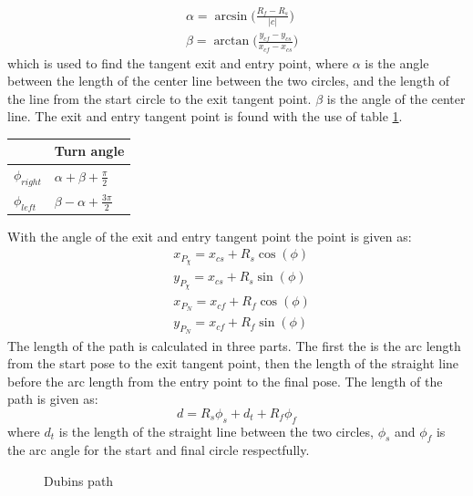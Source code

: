 \begin{subequations}
\begin{align}
& \alpha = \arcsin\big(\frac{R_f-R_s}{|c|}\big) \\
& \beta = \arctan\big(\frac{y_{cf}-y_{cs}}{x_{cf}-x_{cs}}\big)
\end{align}
\end{subequations}
which is used to find the tangent exit and entry point, where $\alpha$ is the angle between the length of the center line between the two circles, and the length of the line from the start circle to the exit tangent point. $\beta$ is the angle of the center line. The exit and entry tangent point is found with the use of table \ref{Tb:ExitEntyrTangent}.
\begin{table}[H]
\begin{center}
\begin{tabular}{ | l | | l |}
\hline
& \textbf{Turn angle} \\ \hline
$\phi_{right}$ & $\alpha + \beta + \frac{\pi}{2}$ \\
$\phi_{left}$ & $\beta - \alpha + \frac{3\pi}{2}$ \\ \hline
\end{tabular}
\end{center}
\label{Tb:ExitEntyrTangent}
\end{table}
With the angle of the exit and entry tangent point the point is given as:
\begin{subequations}
\begin{align}
& x_{P_\chi} = x_{cs} + R_s\cos(\phi) \\
& y_{P_\chi} = x_{cs} + R_s\sin(\phi) \\
& x_{P_N} = x_{cf} + R_f\cos(\phi) \\
& y_{P_N} = x_{cf} + R_f\sin(\phi)
\end{align}
\end{subequations}
The length of the path is calculated in three parts. The first the is the arc length from the start pose to the exit tangent point, then the length of the straight line before the arc length from the entry point to the final pose. The length of the path is given as: 
\begin{equation}
d = R_s\phi_s + d_t + R_f\phi_f
\end{equation}
where $d_t$ is the length of the straight line between the two circles, $\phi_s$ and $\phi_f$ is the arc angle for the start and final circle respectfully. 
\begin{figure}\label{Fig:LandingPhase}
\def\svgwidth{\textwidth} %

\caption{Dubins path}
\end{figure}
